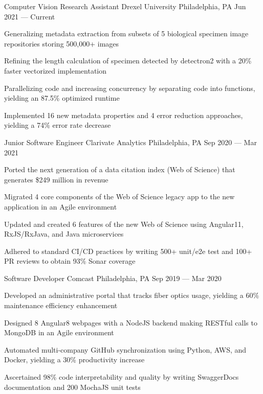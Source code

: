 
\begin{cventries}

  \cventry
    {Computer Vision Research Assistant} %
    {Drexel University} %
    {Philadelphia, PA} %
    {Jun 2021 --- Current} %
    {
      \begin{cvitems} %
        \item{Generalizing metadata extraction from subsets of 5 biological specimen image repositories storing 500,000+ images}
        \item{Refining the length calculation of specimen detected by detectron2 with a 20\% faster vectorized implementation}
        \item{Parallelizing code and increasing concurrency by separating code into functions, yielding an 87.5\% optimized runtime}
        \item{Implemented 16 new metadata properties and 4 error reduction approaches, yielding a 74\% error rate decrease}
      \end{cvitems}
    }
    
  \cventry
    {Junior Software Engineer} %
    {Clarivate Analytics} %
    {Philadelphia, PA} %
    {Sep 2020 --- Mar 2021} %
    {
      \begin{cvitems} %
        \item{Ported the next generation of a data citation index (Web of Science) that generates \$249 million in revenue}
        \item{Migrated 4 core components of the Web of Science legacy app to the new application in an Agile environment}
        \item{Updated and created 6 features of the new Web of Science using Angular11, RxJS/RxJava, and Java microservices}
        \item{Adhered to standard CI/CD practices by writing 500+ unit/e2e test and 100+ PR reviews to obtain 93\% Sonar coverage}
      \end{cvitems}
    }
    
  \cventry
    {Software Developer} %
    {Comcast} %
    {Philadelphia, PA} %
    {Sep 2019 --- Mar 2020} %
    {
      \begin{cvitems} %
        \item{Developed an administrative portal that tracks fiber optics usage, yielding a 60\% maintenance efficiency enhancement}
        \item{Designed 8 Angular8 webpages with a NodeJS backend making RESTful calls to MongoDB in an Agile environment}
        \item{Automated multi-company GitHub synchronization using Python, AWS, and Docker, yielding a 30\% productivity increase}
        \item{Ascertained 98\% code interpretability and quality by writing SwaggerDocs documentation and 200 MochaJS unit tests}
      \end{cvitems}
    }
\end{cventries}
